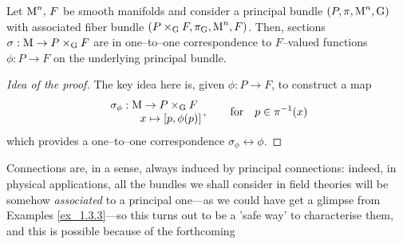 \begin{prop}
    Let $\text{\normalfont M}^n,\,F$ be smooth manifolds and consider a principal bundle $(P,\pi,\text{\normalfont M}^n,\text{\normalfont G})$ with associated fiber bundle $(P\times_{\text{\normalfont G}} F,\pi_{\text{\normalfont G}},\text{\normalfont M}^n,F)$. Then, sections $\sigma:\text{\normalfont M}\to P\times_{\text{\normalfont G}} F$ are in one--to--one correspondence to $F$--valued functions $\phi:P\to F$ on the underlying principal bundle. 
\end{prop}
\begin{proof}[Idea of the proof]
   The key idea here is, given $\phi:P\to F$, to construct a map
   $$\begin{matrix}
       \sigma_\phi:\text{\normalfont M}\to P\times_{\text{\normalfont G}} F\\
       \qquad\quad x\mapsto{[p,\phi(p)]}
   \end{matrix}\,,\qquad\text{for}\quad p\in\pi^{-1}(x)$$
   which provides a one--to--one correspondence $\sigma_\phi\leftrightarrow\phi$.
\end{proof}

Connections are, in a sense, always induced by principal connections: indeed, in physical applications, all the bundles we shall consider in field theories will be somehow \emph{associated} to a principal one---as we could have get a glimpse from Examples \ref{ex_1.3.3}---so this turns out to be a 'safe way' to characterise them, and this is possible because of the forthcoming

